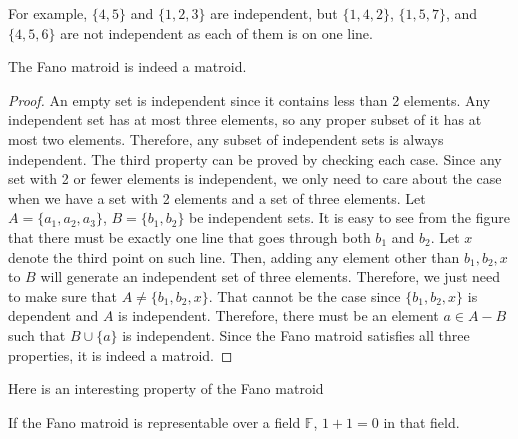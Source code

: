 For example, $\{4, 5\}$ and $\{ 1, 2, 3 \}$ are independent, but $\{ 1, 4, 2 \}$, $\{1, 5, 7\}$, and $\{4, 5, 6 \}$ are not independent as each of them is on one line.

\begin{thm}
The Fano matroid is indeed a matroid.
\end{thm}

\begin{proof}
An empty set is independent since it contains less than 2 elements.
Any independent set has at most three elements, so any proper subset of it has at most two elements.
Therefore, any subset of independent sets is always independent.
The third property can be proved by checking each case.
Since any set with 2 or fewer elements is independent, we only need to care about the case when we have a set with 2 elements and a set of three elements.
Let $A = \{ a_1, a_2, a_3 \}$, $B = \{ b_1, b_2\}$ be independent sets.
It is easy to see from the figure that there must be exactly one line that goes through both $b_1$ and $b_2$.
Let $x$ denote the third point on such line.
Then, adding any element other than $b_1, b_2, x$ to $B$ will generate an independent set of three elements.
Therefore, we just need to make sure that $A \neq \{ b_1, b_2, x \}$.
That cannot be the case since $\{ b_1, b_2, x \}$ is dependent and $A$ is independent.
Therefore, there must be an element $a \in A - B$ such that $B \cup \{ a \}$ is independent.
Since the Fano matroid satisfies all three properties, it is indeed a matroid.
\end{proof}


Here is an interesting property of the Fano matroid
\begin{thm}
If the Fano matroid is representable over a field $\mathbb{F}$, $1 + 1 = 0$ in that field.
\end{thm}

